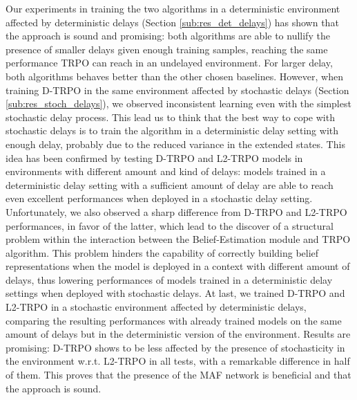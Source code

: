         Our experiments in training the two algorithms in a deterministic environment affected by deterministic delays (Section \ref{sub:res_det_delays}) has shown that the approach is sound and promising: both algorithms are able to nullify the presence of smaller delays given enough training samples, reaching the same performance TRPO can reach in an undelayed environment. For larger delay, both algorithms behaves better than the other chosen baselines. However, when training D-TRPO in the same environment affected by stochastic delays (Section \ref{sub:res_stoch_delays}), we observed inconsistent learning even with the simplest stochastic delay process. This lead us to think that the best way to cope with stochastic delays is to train the algorithm in a deterministic delay setting with enough delay, probably due to the reduced variance in the extended states. This idea has been confirmed by testing D-TRPO and L2-TRPO models in environments with different amount and kind of delays: models trained in a deterministic delay setting with a sufficient amount of delay are able to reach even excellent performances when deployed in a stochastic delay setting. Unfortunately, we also observed a sharp difference from D-TRPO and L2-TRPO performances, in favor of the latter, which lead to the discover of a structural problem within the interaction between the Belief-Estimation module and TRPO algorithm. This problem hinders the capability of correctly building belief representations when the model is deployed in a context with different amount of delays, thus lowering performances of models trained in a deterministic delay settings when deployed with stochastic delays. \newline
        At last, we trained D-TRPO and L2-TRPO in a stochastic environment affected by deterministic delays, comparing the resulting performances with already trained models on the same amount of delays but in the deterministic version of the environment. Results are promising: D-TRPO shows to be less affected by the presence of stochasticity in the environment w.r.t. L2-TRPO in all tests, with a remarkable difference in half of them. This proves that the presence of the MAF network is beneficial and that the approach is sound.
        
